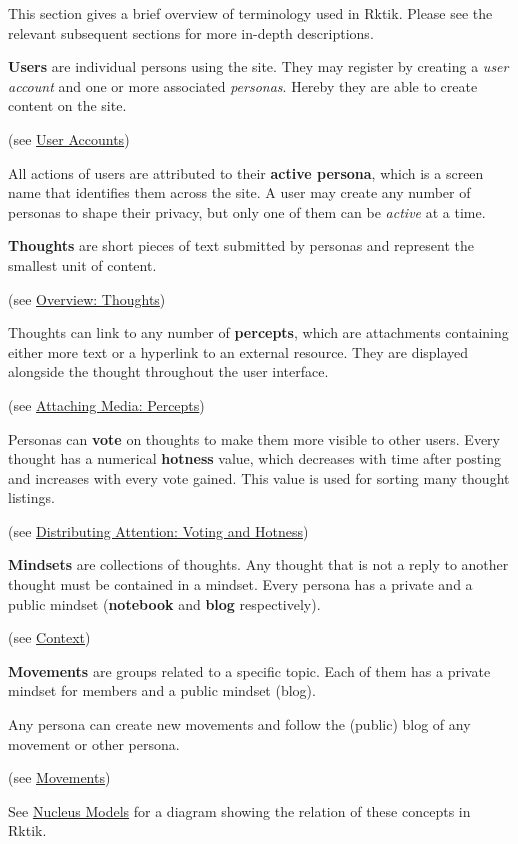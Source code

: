 This section gives a brief overview of terminology used in Rktik. Please
see the relevant subsequent sections for more in-depth descriptions.

\textbf{Users} are individual persons using the site. They may register
by creating a \emph{user account} and one or more associated
\emph{personas}. Hereby they are able to create content on the site.

(see \hyperref[user-accounts]{User Accounts})

All actions of users are attributed to their \textbf{active persona},
which is a screen name that identifies them across the site. A user may
create any number of personas to shape their privacy, but only one of
them can be \emph{active} at a time.

\textbf{Thoughts} are short pieces of text submitted by personas and
represent the smallest unit of content.

(see \hyperref[overview-thoughts]{Overview: Thoughts})

Thoughts can link to any number of \textbf{percepts}, which are
attachments containing either more text or a hyperlink to an external
resource. They are displayed alongside the thought throughout the user
interface.

(see \hyperref[attaching-media-percepts]{Attaching Media: Percepts})

Personas can \textbf{vote} on thoughts to make them more visible to
other users. Every thought has a numerical \textbf{hotness} value, which
decreases with time after posting and increases with every vote gained.
This value is used for sorting many thought listings.

(see \hyperref[hotness]{Distributing Attention: Voting and Hotness})

\textbf{Mindsets} are collections of thoughts. Any thought that is not a
reply to another thought must be contained in a mindset. Every persona
has a private and a public mindset (\textbf{notebook} and \textbf{blog}
respectively).

(see \hyperref[context]{Context})

\textbf{Movements} are groups related to a specific topic. Each of them
has a private mindset for members and a public mindset (blog).

Any persona can create new movements and follow the (public) blog of any
movement or other persona.

(see \hyperref[movements]{Movements})

See \hyperref[nucleus-models]{Nucleus Models} for a diagram showing the
relation of these concepts in Rktik.

